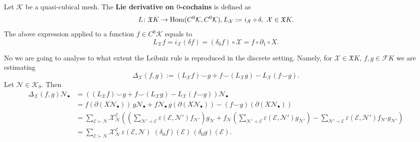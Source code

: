 \begin{definition}
  Let $\mathcal{K}$ be a quasi-cubical mesh.
  The \textbf{Lie derivative on $0$-cochains} is defined as
  \begin{equation}
    L \colon \mathfrak{X} K \to \mathop{\rm Hom}\nolimits(C^0 \mathcal{K}, C^0 \mathcal{K}),
    L_{\mathcal{X}} := i_{\mathcal{X}} \circ \delta,\
    \mathcal{X} \in \mathfrak{X} K.
  \end{equation}
  The above expression applied to a function $f \in C^0 \mathcal{K}$ equals to
  \begin{equation}
    L_{\mathcal{X}} f
    = i_{\mathcal{X}} (\delta f)
    = (\delta_0 f) \circ \mathcal{X}
    = f \circ \partial_1 \circ X.
  \end{equation}
\end{definition}
\begin{remark}
  No we are going to analyse to what extent the Leibniz rule is reproduced in
  the discrete setting.
  Namely, for
  $\mathcal{X} \in \mathfrak{X} K$, $f, g \in \mathcal{F} K$
  we are estimating
  \begin{equation}
    \Delta_\mathcal{X}(f, g) :=
    (L_{\mathcal{X}} f) \smile g
    + f \smile (L_{\mathcal{X}} g)
    - L_{\mathcal{X}} (f \smile g).
  \end{equation}
  Let $\mathcal{N} \in \mathcal{K}_0$.
  Then
  \begin{equation}
    \begin{split}
        \Delta_\mathcal{X}(f, g) \mathcal{N}_\bullet
      & =
        ((L_{\mathcal{X}} f) \smile g + f \smile (L_{\mathcal{X}} g)
        - L_{\mathcal{X}} (f \smile g)) \mathcal{N}_\bullet \\
      & = f (\partial(X \mathcal{N}_\bullet))\, g \mathcal{N}_\bullet
        + f \mathcal{N}_\bullet\, g (\partial(X \mathcal{N}_\bullet))
        - (f \smile g)(\partial(X \mathcal{N}_\bullet)) \\
      & = \sum_{\mathcal{E} \succ \mathcal{N}}
        \mathcal{X}_\mathcal{N}^\mathcal{E}
        ( (\sum_{\mathcal{N}' \prec \mathcal{E}}
          \varepsilon(\mathcal{E}, \mathcal{N}') f_{\mathcal{N}'})
          g_{\mathcal{N}}
          + f_{\mathcal{N}} (\sum_{\mathcal{N}' \prec \mathcal{E}}
          \varepsilon(\mathcal{E}, \mathcal{N}') g_{\mathcal{N}'})
          - \sum_{\mathcal{N}' \prec \mathcal{E}}
          \varepsilon(\mathcal{E}, \mathcal{N}')
          f_{\mathcal{N}'} g_{\mathcal{N}'}
        ) \\
      & = \sum_{\mathcal{E} \succ \mathcal{N}}
        \mathcal{X}_\mathcal{N}^\mathcal{E}\,
        \varepsilon(\mathcal{E}, \mathcal{N})\,
        \, (\delta_0 f)(\mathcal{E})\,
        (\delta_0 g)(\mathcal{E}).
    \end{split}
  \end{equation}
\end{remark}
